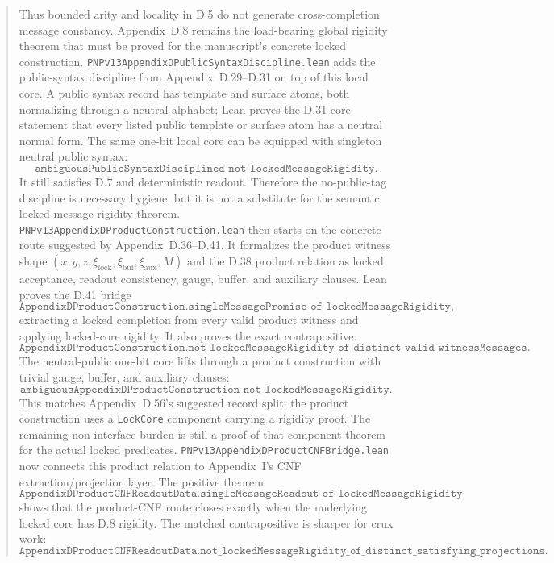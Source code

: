 \documentclass[11pt]{article}
\theoremstyle{remark}
\begin{document}
\begin{abstract}
\[\]
Thus bounded arity and locality in D.5 do not generate cross-completion message
constancy.  Appendix~D.8 remains the load-bearing global rigidity theorem that
must be proved for the manuscript's concrete locked construction.
\texttt{PNPv13AppendixDPublicSyntaxDiscipline.lean} adds the public-syntax
discipline from Appendix~D.29--D.31 on top of this local core.  A public syntax
record has template and surface atoms, both normalizing through a neutral
alphabet; Lean proves the D.31 core statement that every listed public template
or surface atom has a neutral normal form.  The same one-bit local core can be
equipped with singleton neutral public syntax:
\[
  \texttt{ambiguousPublicSyntaxDisciplined\_not\_lockedMessageRigidity}.
\]
It still satisfies D.7 and deterministic readout.  Therefore the no-public-tag
discipline is necessary hygiene, but it is not a substitute for the semantic
locked-message rigidity theorem.
\texttt{PNPv13AppendixDProductConstruction.lean} then starts on the concrete
route suggested by Appendix~D.36--D.41.  It formalizes the product witness
shape \((x,g,z,\xi_{\mathrm{lock}},\xi_{\mathrm{buf}},\xi_{\mathrm{aux}},M)\)
and the D.38 product relation as locked acceptance, readout consistency, gauge,
buffer, and auxiliary clauses.  Lean proves the D.41 bridge
\[
  \texttt{AppendixDProductConstruction.singleMessagePromise\_of\_lockedMessageRigidity},
\]
extracting a locked completion from every valid product witness and applying
locked-core rigidity.  It also proves the exact contrapositive:
\[
  \texttt{AppendixDProductConstruction.not\_lockedMessageRigidity\_of\_distinct\_valid\_witnessMessages}.
\]
The neutral-public one-bit core lifts through a product construction with
trivial gauge, buffer, and auxiliary clauses:
\[
  \texttt{ambiguousAppendixDProductConstruction\_not\_lockedMessageRigidity}.
\]
This matches Appendix~D.56's suggested record split: the product construction
uses a \texttt{LockCore} component carrying a rigidity proof.  The remaining
non-interface burden is still a proof of that component theorem for the actual
locked predicates.
\texttt{PNPv13AppendixDProductCNFBridge.lean} now connects this product
relation to Appendix~I's CNF extraction/projection layer.  The positive theorem
\[
  \texttt{AppendixDProductCNFReadoutData.singleMessageReadout\_of\_lockedMessageRigidity}
\]
shows that the product-CNF route closes exactly when the underlying locked core
has D.8 rigidity.  The matched contrapositive is sharper for crux work:
\[
  \texttt{AppendixDProductCNFReadoutData.not\_lockedMessageRigidity\_of\_distinct\_satisfying\_projections}.
\]
\end{abstract}
\end{document}
